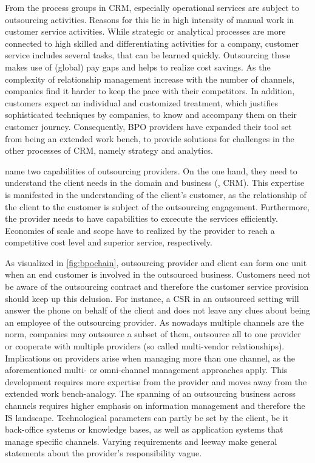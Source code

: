 		From the process groups in \acrshort{CRM}, especially operational services are subject to outsourcing activities. Reasons for this lie in high intensity of manual work in customer service activities. While strategic or analytical processes are more connected to high skilled and differentiating activities for a company, customer service includes several tasks, that can be learned quickly. Outsourcing these makes use of (global) pay gaps and helps to realize cost savings. As the complexity of relationship management increase with the number of channels, companies find it harder to keep the pace with their competitors. In addition, customers expect an individual and customized treatment, which justifies sophisticated techniques by companies, to know and accompany them on their customer journey. Consequently, BPO providers have expanded their tool set from being an extended work bench, to provide solutions for challenges in the other processes of CRM, namely strategy and analytics. 
		
		\citeauthor{Ramachandran2004} name two capabilities of outsourcing providers. On the one hand, they need to understand the client needs in the domain and business (\eg, CRM). This expertise is manifested in the understanding of the client's customer, as the relationship of the client to the customer is subject of the outsourcing engagement. Furthermore, the provider needs to have capabilities to excecute the services efficiently. Economies of scale and scope have to realized by the provider to reach a competitive cost level and superior service, respectively. 
		
		As visualized in \Fig \ref{fig:bpochain}, outsourcing provider and client can form one unit when an end customer is involved in the outsourced business. Customers need not be aware of the outsourcing contract and therefore the customer service provision should keep up this delusion. For instance, a \acrshort{CSR} in an outsourced setting will answer the phone on behalf of the client and does not leave any clues about being an employee of the outsourcing provider. As nowadays multiple channels are the norm, companies may outsource a subset of them, outsource all to one provider or cooperate with multiple providers (so called multi-vendor relationships). Implications on providers arise when managing more than one channel, as the aforementioned multi- or omni-channel management approaches apply. This development requires more expertise from the provider and moves away from the extended work bench-analogy. The spanning of an outsourcing business across channels requires higher emphasis on information management and therefore the \acrshort{IS} landscape. Technological parameters can partly be set by the client, be it back-office systems or knowledge bases, as well as application systems that manage specific channels. Varying requirements and leeway make general statements about the provider's responsibility vague. 
		
